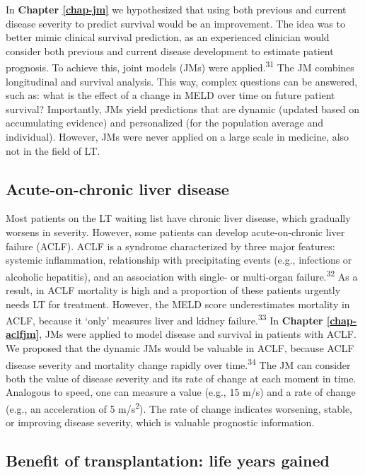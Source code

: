 \documentclass[11pt,english,]{book} %
\begin{document}
In \textbf{Chapter \ref{chap-jm}} we hypothesized that using both previous and current disease severity to predict survival would be an improvement. The idea was to better mimic clinical survival prediction, as an experienced clinician would consider both previous and current disease development to estimate patient prognosis. To achieve this, joint models (JMs) were applied.\textsuperscript{31} The JM combines longitudinal and survival analysis. This way, complex questions can be answered, such as: what is the effect of a change in MELD over time on future patient survival? Importantly, JMs yield predictions that are dynamic (updated based on accumulating evidence) and personalized (for the population average and individual). However, JMs were never applied on a large scale in medicine, also not in the field of LT.

\hypertarget{acute-on-chronic-liver-disease}{%
\subsection*{Acute-on-chronic liver disease}\label{acute-on-chronic-liver-disease}}

Most patients on the LT waiting list have chronic liver disease, which gradually worsens in severity. However, some patients can develop acute-on-chronic liver failure (ACLF). ACLF is a syndrome characterized by three major features: systemic inflammation, relationship with precipitating events (e.g., infections or alcoholic hepatitis), and an association with single- or multi-organ failure.\textsuperscript{32} As a result, in ACLF mortality is high and a proportion of these patients urgently needs LT for treatment. However, the MELD score underestimates mortality in ACLF, because it `only' measures liver and kidney failure.\textsuperscript{33} In \textbf{Chapter \ref{chap-aclfjm}}, JMs were applied to model disease and survival in patients with ACLF. We proposed that the dynamic JMs would be valuable in ACLF, because ACLF disease severity and mortality change rapidly over time.\textsuperscript{34} The JM can consider both the value of disease severity and its rate of change at each moment in time. Analogous to speed, one can measure a value (e.g., 15 m/s) and a rate of change (e.g., an acceleration of 5 m/s\textsuperscript{2}). The rate of change indicates worsening, stable, or improving disease severity, which is valuable prognostic information.

\hypertarget{benefit-of-transplantation-life-years-gained}{%
\subsection*{Benefit of transplantation: life years gained}\label{benefit-of-transplantation-life-years-gained}}
\end{document}
